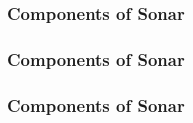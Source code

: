 \documentclass{beamer}
\begin{document}
\begin{frame}
    \frametitle{Components of Sonar}
\end{frame}

\begin{frame}
    \frametitle{Components of Sonar}
\end{frame}

\begin{frame}
    \frametitle{Components of Sonar}
\end{frame}
\end{document}
